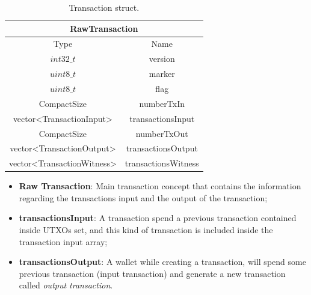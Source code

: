 \begin{table}[H]
    \centering\small
       \begin{tabular}{|c|c|}
        \hline
        \multicolumn{2}{|c|}{\textbf{RawTransaction}} \\
        \hline
        \multicolumn{1}{|c|}{Type} & \multicolumn{1}{c|}{Name} \\       
        \hline \hline
        $int32\_t$ & version   \\
        \hline
        $uint8\_t$ & marker \\
        \hline
        $uint8\_t$ & flag \\
        \hline
        CompactSize & numberTxIn \\
        \hline
        vector<TransactionInput> & transactionsInput \\
        \hline
        CompactSize & numberTxOut \\
        \hline
        vector<TransactionOutput> & transactionsOutput \\
        \hline
        vector<TransactionWitness> & transactionsWitness \\
        \hline
    \end{tabular}   
    \caption{Transaction struct\cite{Palazzo_Estrazione_di_Informazioni_2021}.\label{tab:rawtxbitcoinc}}
\end{table}

\begin{itemize}
    \item {\bf Raw Transaction}: Main transaction concept that contains the information
        regarding the transactions input and the output of the transaction;
    \item {\bf transactionsInput}: A transaction spend a previous transaction contained
        inside UTXOs set, and this kind of transaction is included inside
        the transaction input array;
    \item {\bf transactionsOutput}: A wallet while creating a transaction, will spend some previous
        transaction (input transaction) and generate a new transaction called \emph{output transaction}.
\end{itemize}


